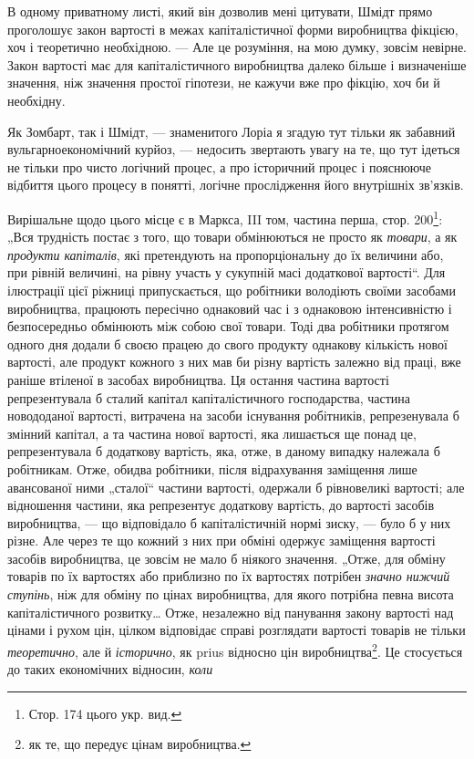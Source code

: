 \parcont{}  %
В одному приватному листі, який він дозволив мені цитувати, Шмідт прямо проголошує закон вартості в межах капіталістичної форми
виробництва фікцією, хоч і теоретично необхідною. — Але це розуміння, на мою думку, зовсім невірне. Закон вартості має для
капіталістичного виробництва далеко більше і визначеніше значення, ніж значення простої гіпотези, не кажучи вже про фікцію,
хоч би й необхідну.

Як Зомбарт, так і Шмідт, — знаменитого Лоріа я згадую тут тільки як забавний вульгарноекономічний
курйоз, — недосить звертають увагу на те, що тут ідеться не тільки про чисто логічний процес, а про історичний процес і
пояснююче відбиття цього процесу в понятті, логічне прослідження його внутрішніх зв’язків.

Вирішальне щодо цього місце є в
Маркса, III том, частина перша, стор. 200\footnote*{Стор. 174 цього укр. вид. }: „Вся трудність постає з того, що товари обмінюються не просто як \emph{товари}, а як
\emph{продукти капіталів}, які претендують на пропорціональну до їх величини або, при рівній величині, на рівну участь у сукупній
масі додаткової вартості“.  Для ілюстрації цієї ріжниці припускається, що робітники володіють своїми засобами виробництва,
працюють пересічно однаковий час і з однаковою інтенсивністю і безпосередньо обмінюють між собою свої товари. Тоді два
робітники протягом одного дня додали б своєю працею до свого продукту однакову кількість нової вартості, але продукт кожного
з них мав би різну вартість залежно від праці, вже раніше втіленої в засобах виробництва. Ця остання частина вартості
репрезентувала б сталий капітал капіталістичного господарства, частина новододаної вартості, витрачена на засоби існування
робітників, репрезенувала б змінний капітал, а та частина нової вартості, яка лишається ще понад це, репрезентувала б
додаткову вартість, яка, отже, в даному випадку належала б робітникам. Отже, обидва робітники, після відрахування заміщення
лише авансованої ними „сталої“ частини вартості, одержали б рівновеликі вартості; але відношення частини, яка репрезентує
додаткову вартість, до
вартості засобів виробництва, — що відповідало б капіталістичній нормі зиску, — було б у них різне. Але через те що кожний з них
при обміні одержує заміщення вартості засобів виробництва, це зовсім не мало б ніякого значення. „Отже, для обміну
товарів по їх вартостях або приблизно по їх вартостях потрібен \emph{значно нижчий ступінь}, ніж для обміну по цінах виробництва,
для якого потрібна певна висота капіталістичного розвитку\dots{} Отже, незалежно від панування закону вартості над цінами і
рухом цін, цілком відповідає справі розглядати вартості товарів не тільки \emph{теоретично}, але й \emph{історично}, як prius відносно цін
виробництва\footnote*{як те, що передує цінам виробництва. }. Це стосується до таких економічних відносин, \emph{коли}
\parbreak{}  %
